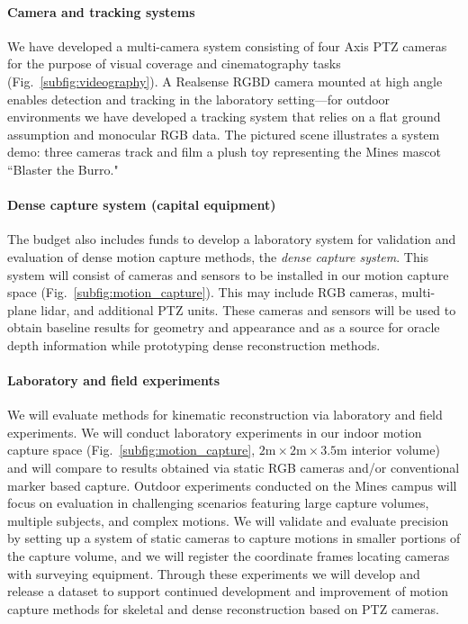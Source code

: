 \documentclass[11pt]{article}
\begin{document}
\paragraph{Camera and tracking systems}

We have developed a multi-camera system consisting of four Axis
PTZ cameras for the purpose of visual coverage and cinematography
tasks (Fig.~\ref{subfig:videography}).
A Realsense RGBD camera mounted at high angle enables detection and tracking
in the laboratory setting---for outdoor environments we have
developed a tracking system that relies on a flat ground assumption and
monocular RGB data.
The pictured scene illustrates a system demo: three cameras track and film a
plush toy representing the Mines mascot ``Blaster the Burro."

\paragraph{Dense capture system (capital equipment)}

The budget also includes funds to develop a laboratory system for
validation and evaluation of dense motion capture methods, the \emph{dense
capture system}.
This system will consist of cameras and sensors to be installed in our motion
capture space (Fig.~\ref{subfig:motion_capture}).
This may include RGB cameras, multi-plane lidar, and additional PTZ units.
These cameras and sensors will be used to obtain baseline results for geometry
and appearance and as a source for oracle depth information while prototyping
dense reconstruction methods.

\paragraph{Laboratory and field experiments}

We will evaluate methods for kinematic reconstruction via laboratory and field
experiments.
We will conduct laboratory experiments in our indoor motion capture space
(Fig.~\ref{subfig:motion_capture},
$2\mathrm{m} \times 2\mathrm{m} \times 3.5\mathrm{m}$ interior volume) and
will compare to results obtained via
static RGB cameras and/or conventional marker based capture.
%
Outdoor experiments conducted on the Mines campus will focus on evaluation
in challenging scenarios featuring large capture volumes, multiple subjects, and
complex motions.
We will validate and evaluate precision by setting up a system of static cameras
to capture motions in smaller portions of the capture volume, and we will
register the coordinate frames locating cameras with surveying equipment.
Through these experiments we will develop and release a dataset to support
continued development and improvement of motion capture
methods for skeletal and dense reconstruction based on PTZ cameras.
\end{document}

